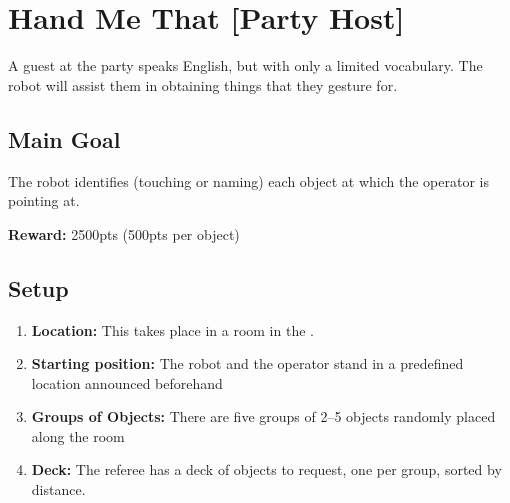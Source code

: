 \section{Hand Me That [Party Host]}
\label{test:hand-me-that}
A guest at the party speaks English, but with only a limited vocabulary. The robot will assist them in obtaining things that they gesture for.


\subsection*{Main Goal}
The robot identifies (touching or naming) each object at which the operator is pointing at.

\noindent\textbf{Reward:} 2500pts (500pts per object)


%
%
\subsection*{Setup}
\begin{enumerate}[nosep]
	\item \textbf{Location:} This takes place in a room in the \Arena{}.

	\item \textbf{Starting position:} The robot and the operator stand in a predefined location announced beforehand %

	\item \textbf{Groups of Objects:} There are five groups of 2--5 objects randomly placed along the room

	\item \textbf{Deck:} The referee has a deck of objects to request, one per group, sorted by distance.

\end{enumerate}


%
%
